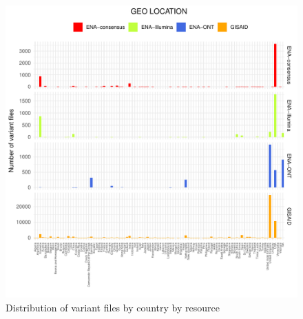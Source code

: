 \documentclass[a4paper, 10pt]{article}        %
\begin{document}
   \begin{figure}[!htb]
     \centering
       \includegraphics[width=1\textwidth]{all_loc_res_facet.pdf}
     \caption{Distribution of variant files by country by resource}
     \label{fig:loc}
 \end{figure}



\end{document}
